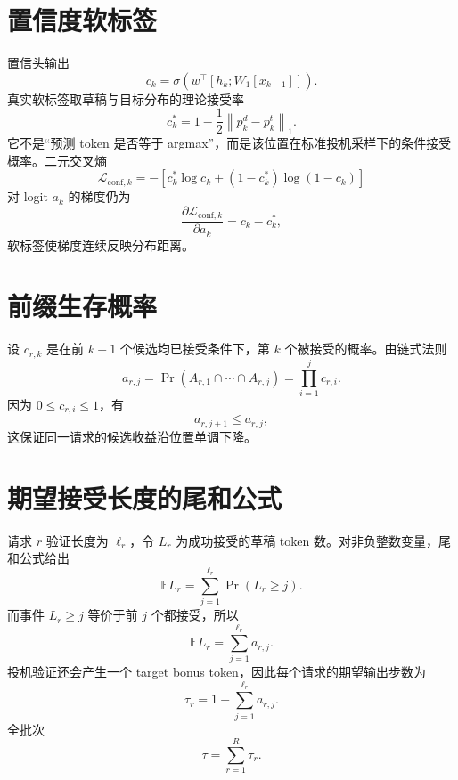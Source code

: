 \documentclass[UTF8,12pt,a4paper,fontset=none]{ctexart}
\numberwithin{equation}{section}
\newcommand{\E}{\mathbb{E}}
\newcommand{\Loss}{\mathcal{L}}
\newcommand{\norm}[1]{\left\lVert #1\right\rVert}
\begin{document}
\section{置信度软标签}
置信头输出
\begin{equation}
 c_k=\sigma\left(w^\top[h_k;W_1[x_{k-1}]]\right).
\end{equation}
真实软标签取草稿与目标分布的理论接受率
\begin{equation}
 \boxed{
 c_k^*=1-\frac12\norm{p_k^d-p_k^t}_1.
 }
\end{equation}
它不是“预测 token 是否等于 argmax”，而是该位置在标准投机采样下的条件接受概率。二元交叉熵
\begin{equation}
 \Loss_{\mathrm{conf},k}
 =-[c_k^*\log c_k+(1-c_k^*)\log(1-c_k)]
\end{equation}
对 logit $a_k$ 的梯度仍为
\begin{equation}
 \frac{\partial\Loss_{\mathrm{conf},k}}{\partial a_k}=c_k-c_k^*,
\end{equation}
软标签使梯度连续反映分布距离。

\section{前缀生存概率}
设 $c_{r,k}$ 是在前 $k-1$ 个候选均已接受条件下，第 $k$ 个被接受的概率。由链式法则
\begin{equation}
 \boxed{
 a_{r,j}=\Pr(A_{r,1}\cap\cdots\cap A_{r,j})
 =\prod_{i=1}^{j}c_{r,i}.
 }
\end{equation}
因为 $0\le c_{r,i}\le1$，有
\begin{equation}
 a_{r,j+1}\le a_{r,j},
\end{equation}
这保证同一请求的候选收益沿位置单调下降。

\section{期望接受长度的尾和公式}
请求 $r$ 验证长度为 $\ell_r$，令 $L_r$ 为成功接受的草稿 token 数。对非负整数变量，尾和公式给出
\begin{equation}
 \E L_r=\sum_{j=1}^{\ell_r}\Pr(L_r\ge j).
\end{equation}
而事件 $L_r\ge j$ 等价于前 $j$ 个都接受，所以
\begin{equation}
 \E L_r=\sum_{j=1}^{\ell_r}a_{r,j}.
\end{equation}
投机验证还会产生一个 target bonus token，因此每个请求的期望输出步数为
\begin{equation}
 \boxed{
 \tau_r=1+\sum_{j=1}^{\ell_r}a_{r,j}.
 }
\end{equation}
全批次
\begin{equation}
 \tau=\sum_{r=1}^{R}\tau_r.
\end{equation}
\end{document}
